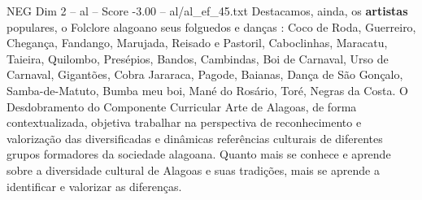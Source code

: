 \begin{textsample}{NEG Dim 2 – al – Score -3.00 – al/al\_ef\_45.txt}
Destacamos, ainda, os \textbf{artistas} populares, o Folclore alagoano seus folguedos e danças : Coco de Roda, Guerreiro, Chegança, Fandango, Marujada, Reisado e Pastoril, Caboclinhas, Maracatu, Taieira, Quilombo, Presépios, Bandos, Cambindas, Boi de Carnaval, Urso de Carnaval, Gigantões, Cobra Jararaca, Pagode, Baianas, Dança de São Gonçalo, Samba-de-Matuto, Bumba meu boi, Mané do Rosário, Toré, Negras da Costa.
O Desdobramento do Componente Curricular Arte de Alagoas, de forma contextualizada, objetiva trabalhar na perspectiva de reconhecimento e valorização das diversificadas e dinâmicas referências culturais de diferentes grupos formadores da sociedade alagoana.
Quanto mais se conhece e aprende sobre a diversidade cultural de Alagoas e suas tradições, mais se aprende a identificar e valorizar as diferenças.

\end{textsample}
